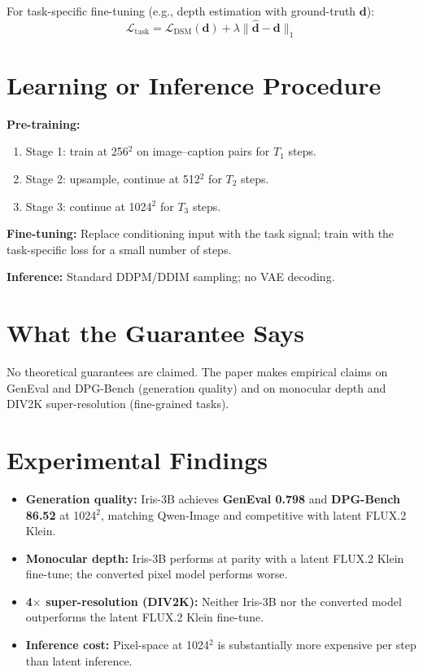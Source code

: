 \documentclass[10pt,twocolumn]{article}
\begin{document}
For task-specific fine-tuning (e.g., depth estimation with ground-truth $\mathbf{d}$):
\[
\mathcal{L}_\text{task} = \mathcal{L}_\text{DSM}(\mathbf{d})
+ \lambda\|\hat{\mathbf{d}} - \mathbf{d}\|_1
\]

\section{Learning or Inference Procedure}

\textbf{Pre-training:}
\begin{enumerate}[itemsep=2pt,parsep=0pt]
  \item Stage 1: train at 256$^2$ on image--caption pairs for $T_1$ steps.
  \item Stage 2: upsample, continue at 512$^2$ for $T_2$ steps.
  \item Stage 3: continue at 1024$^2$ for $T_3$ steps.
\end{enumerate}

\textbf{Fine-tuning:} Replace conditioning input with the task signal;
train with the task-specific loss for a small number of steps.

\textbf{Inference:} Standard DDPM/DDIM sampling; no VAE decoding.

\section{What the Guarantee Says}

No theoretical guarantees are claimed. The paper makes empirical claims on
GenEval and DPG-Bench (generation quality) and on monocular depth
and DIV2K super-resolution (fine-grained tasks).

\section{Experimental Findings}

\begin{itemize}[itemsep=2pt,parsep=0pt]
  \item \textbf{Generation quality:} Iris-3B achieves \textbf{GenEval 0.798}
    and \textbf{DPG-Bench 86.52} at 1024$^2$, matching Qwen-Image and
    competitive with latent FLUX.2 Klein.
  \item \textbf{Monocular depth:} Iris-3B performs at parity with a latent
    FLUX.2 Klein fine-tune; the converted pixel model performs worse.
  \item \textbf{4$\times$ super-resolution (DIV2K):} Neither Iris-3B nor
    the converted model outperforms the latent FLUX.2 Klein fine-tune.
  \item \textbf{Inference cost:} Pixel-space at 1024$^2$ is substantially
    more expensive per step than latent inference.
\end{itemize}
\end{document}
